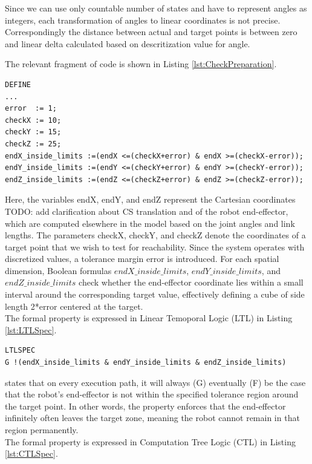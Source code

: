 Since we can use only countable number of states and have to represent angles as  integers,
each transformation of angles to linear coordinates is not precise. 
Correspondingly the distance between actual and target points is between zero and linear 
delta calculated based on descritization value for angle.

The relevant fragment of code is shown in Listing \ref{lst:CheckPreparation}.

\begin{lstlisting}[language=NuSMV, caption={End effector and target point coincidence condition}, label={lst:CheckPreparation}]
DEFINE
...
error  := 1;
checkX := 10;
checkY := 15;
checkZ := 25;
endX_inside_limits :=(endX <=(checkX+error) & endX >=(checkX-error));
endY_inside_limits :=(endY <=(checkY+error) & endY >=(checkY-error));
endZ_inside_limits :=(endZ <=(checkZ+error) & endZ >=(checkZ-error));
\end{lstlisting}


Here, the variables endX, endY, and endZ represent the Cartesian coordinates TODO: add clarification about CS translation and 
of the robot end-effector, which are computed elsewhere in the model 
based on the joint angles and link lengths. The parameters checkX, checkY, and checkZ 
denote the coordinates of a target point that we wish to test for reachability. 
Since the system operates with discretized values, a tolerance margin error is introduced. 
For each spatial dimension, Boolean formulas $endX\_inside\_limits$, $endY\_inside\_limits$, 
and $endZ\_inside\_limits$ check whether the end-effector coordinate lies within a 
small interval around the corresponding target value, effectively 
defining a cube of side length 2*error centered at the target.\\
The formal property is expressed in Linear Temoporal Logic (LTL) in Listing \ref{lst:LTLSpec}.

\begin{lstlisting}[language=NuSMV, caption={Reachability condition in LTL specification}, label={lst:LTLSpec}]
LTLSPEC 
G !(endX_inside_limits & endY_inside_limits & endZ_inside_limits)
\end{lstlisting}

states that on every execution path, it will always (G) eventually (F) be 
the case that the robot’s end-effector is not within the specified tolerance region around 
the target point. In other words, the property enforces that the end-effector infinitely often 
leaves the target zone, meaning the robot cannot remain in that region permanently.\\
The formal property is expressed in Computation Tree Logic (CTL) in Listing \ref{lst:CTLSpec}.

